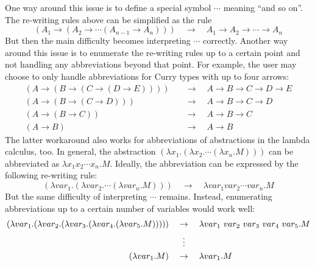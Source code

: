 One way around this issue is to define a special symbol $\cdots$ meaning ``and so on''. The re-writing rules above can be simplified as the rule
\[
    (A_1 \to (A_2 \to \cdots (A_{n-1} \to A_n))) \quad \to \quad A_1 \to A_2 \to \cdots \to A_n
\]
But then the main difficulty becomes interpreting $\cdots$ correctly. Another way around this issue is to enumerate the re-writing rules up to a certain point and not handling any abbreviations beyond that point. For example, the user may choose to only handle abbreviations for Curry types with up to four arrows:
\begin{align*}
    (A \to (B \to (C \to (D \to E)))) \quad &\to \quad A \to B \to C \to D \to E \\
    (A \to (B \to (C \to D))) \quad &\to \quad A \to B \to C \to D \\
    (A \to (B \to C)) \quad &\to \quad A \to B \to C \\
    (A \to B) \quad &\to \quad A \to B
\end{align*}
The latter workaround also works for abbreviations of abstractions in the lambda calculus, too. In general, the abstraction $(\lambda x_1. (\lambda x_2. \cdots (\lambda x_n. M)))$ can be abbreviated as $\lambda x_1 x_2 \cdots x_n. M$. Ideally, the abbreviation can be expressed by the following re-writing rule:
\[
     (\lambda var_1. (\lambda var_2. \cdots (\lambda var_n. M))) \quad \to \quad \lambda var_1 var_2 \cdots var_n. M
\]
But the same difficulty of interpreting $\cdots$ remains. Instead, enumerating abbreviations up to a certain number of variables would work well:
\begin{align*}
    (\lambda var_1. (\lambda var_2. (\lambda var_3. (\lambda var_4. (\lambda var_5. M))))) \quad &\to \quad \lambda var_1\ var_2\ var_3\ var_4\ var_5. M \\
    &\vdotswithin{\to} \\
    (\lambda var_1. M) \quad &\to \quad \lambda var_1. M
\end{align*}
